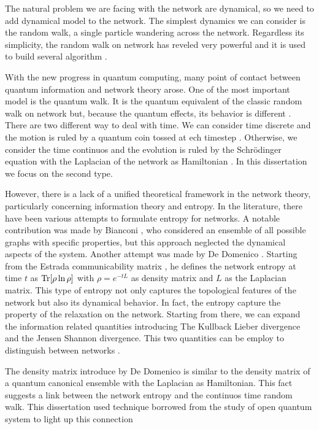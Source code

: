 The natural problem we are facing with the network are dynamical, so we need to add dynamical model to the network. The simplest dynamics we can consider is the random walk, a single particle wandering across the network. 
Regardless its simplicity, the random walk on network has reveled very powerful and it is used to build several algorithm \cite{Classic_random_walk,Pagerank_2015,Pagerank_1998}.


With the new progress in quantum computing, many point of contact between quantum information and network theory arose.
One of the most important model is the quantum walk. It is the quantum equivalent of the classic random walk on network but, because the quantum effects, its behavior is different \cite{Kempe}. There are two different way to deal with time. We can consider time discrete and the motion is ruled by a quantum coin tossed at ech timestep \cite{Coin_quantum_walk}. Otherwise, we consider the time continuos and the evolution is ruled by the Schrödinger equation with the Laplacian of the network as Hamiltonian \cite{Farhi_98}. In this dissertation we focus on the second type.


However, there is a lack of a unified theoretical framework in the network theory, particularly concerning information theory and entropy. 
In the literature, there have been various attempts to formulate entropy for networks. A notable contribution was made by Bianconi \cite{Bianconi_entropy_1,Bianconi_entropy_2}, who considered an ensemble of all possible graphs with specific properties, but this approach neglected the dynamical aspects of the system.
Another attempt was made by De Domenico \cite{De_Domenico_2016}. Starting from the Estrada communicability matrix \cite{Estrada_2008}, he defines the network entropy at time $t$ as $\operatorname{Tr}[\rho \ln \rho]$ with $\rho = e^{-tL}$ as density matrix and $L$ as the Laplacian matrix. This type of entropy not only captures the topological features of the network but also its dynamical behavior. In fact, the entropy capture the property of the relaxation on the network. Starting from there, we can expand the information related quantities introducing The Kullback Lieber divergence and the Jensen Shannon divergence. This two quantities can be employ to distinguish between networks \cite{multilayer}.


The density matrix introduce by De Domenico is similar to the density matrix of a quantum canonical ensemble with the Laplacian as Hamiltonian. This fact suggests a link between the network entropy and the continuos time random walk.
This dissertation used technique borrowed from the study of open quantum system to light up this connection
  

